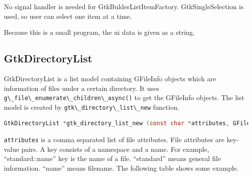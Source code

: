 No signal handler is needed for GtkBulderListItemFactory.
GtkSingleSelection is used, so user can select one item at a time.

Because this is a small program, the ui data is given as a string.

\hypertarget{gtkdirectorylist}{%
\subsection{GtkDirectoryList}\label{gtkdirectorylist}}

GtkDirectoryList is a list model containing GFileInfo objects which are
information of files under a certain directory. It uses
\passthrough{\lstinline!g\_file\_enumerate\_children\_async()!} to get
the GFileInfo objects. The list model is created by
\passthrough{\lstinline!gtk\_directory\_list\_new!} function.

\begin{lstlisting}[language=C]
GtkDirectoryList *gtk_directory_list_new (const char *attributes, GFile *file);
\end{lstlisting}

\passthrough{\lstinline!attributes!} is a comma separated list of file
attributes. File attributes are key-value pairs. A key consists of a
namespace and a name. For example, ``standard::name'' key is the name of
a file. ``standard'' means general file information. ``name'' means
filename. The following table shows some example.

